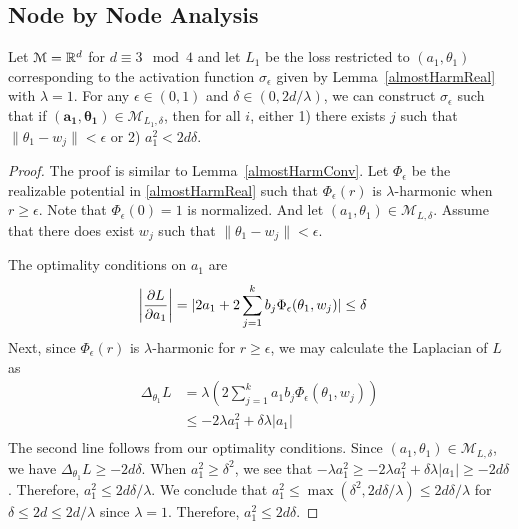 \subsection{Node by Node Analysis}

\begin{lemma}\label{nodeConv}
Let $\mathcal{M} = {\mathbb{R}}^d$ for $d \equiv 3 \mod 4$ and let $L_1$ be the loss restricted to $(a_1,\theta_1)$ corresponding to the activation function $\sigma_\epsilon$ given by Lemma~\ref{almostHarmReal} with $\lambda = 1$. For any $\epsilon \in (0,1)$ and $\delta \in (0, 2d/\lambda)$, we can construct $\sigma_\epsilon$ such that if $\boldsymbol{(a_1,\theta_1)} \in \mathcal{M}_{L_1,\delta}$, then for all $i$, either 1) there exists $j$ such that $\|\theta_1 - w_j\| < \epsilon$ or 2) $a_1^2 < 2d\delta$.
\end{lemma}

\begin{proof}
The proof is similar to Lemma~\ref{almostHarmConv}. Let $\Phi_\epsilon$ be the realizable potential in \ref{almostHarmReal} such that $\Phi_\epsilon(r)$ is $\lambda$-harmonic when $r \geq \epsilon$. Note that $\Phi_\epsilon(0) = 1$ is normalized. And let $(a_1,\theta_1) \in \mathcal{M}_{L,\delta}$. Assume that there does exist $w_j$ such that $\|\theta_1 - w_j\| < \epsilon$. 
 
The optimality conditions on ${ a_1}$ are 
\begin{align*}
   \left| \frac{\partial L}{\partial a_1} \right| & = \lvert 2a_1  + 2\sum_{j=1}^k b_j \Phi_\epsilon(\theta_1,w_j) \rvert \leq \delta
\end{align*}
%
Next, since $\Phi_\epsilon(r)$ is $\lambda$-harmonic for $r \geq \epsilon$, we may calculate the Laplacian of $L$ as
%
\begin{align*}
\Delta_{\theta_1} L & = \lambda \left(2\sum_{j=1}^k a_1b_j
  \Phi_\epsilon(\theta_1, w_j) \right) \\
& \leq  -2\lambda a_1^2 + \delta \lambda |a_1| \\
\end{align*} 
%
The second line follows from our optimality conditions. Since ${(a_1,\theta_1)} \in \mathcal{M}_{L,\delta}$, we have $\Delta_{\theta_1} L \geq - 2d\delta$. When $a_1^2 \geq \delta^2$, we see that $-\lambda a_1^2 \geq -2 \lambda a_1^2 + \delta\lambda |a_1| \geq -2d\delta$. Therefore, $a_1^2 \leq 2d\delta/\lambda$. We conclude that $a_1^2 \leq \max(\delta^2, 2d\delta/\lambda) \leq 2d\delta/\lambda$ for $\delta\leq 2d \leq 2d/\lambda$ since $\lambda = 1$. Therefore, $a_1^2 \leq 2d\delta$.
\end{proof}

